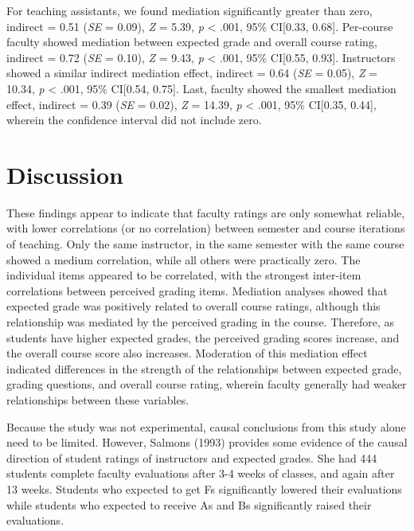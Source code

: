 \documentclass[,man]{apa6}
\theoremstyle{definition}
\theoremstyle{definition}
\theoremstyle{definition}
\theoremstyle{remark}
\begin{document}
For teaching assistants, we found mediation significantly greater than
zero, indirect = 0.51 (\emph{SE} = 0.09), \emph{Z} = 5.39, \emph{p}
\textless{} .001, 95\% CI{[}0.33, 0.68{]}. Per-course faculty showed
mediation between expected grade and overall course rating, indirect =
0.72 (\emph{SE} = 0.10), \emph{Z} = 9.43, \emph{p} \textless{} .001,
95\% CI{[}0.55, 0.93{]}. Instructors showed a similar indirect mediation
effect, indirect = 0.64 (\emph{SE} = 0.05), \emph{Z} = 10.34, \emph{p}
\textless{} .001, 95\% CI{[}0.54, 0.75{]}. Last, faculty showed the
smallest mediation effect, indirect = 0.39 (\emph{SE} = 0.02), \emph{Z}
= 14.39, \emph{p} \textless{} .001, 95\% CI{[}0.35, 0.44{]}, wherein the
confidence interval did not include zero.

\hypertarget{discussion}{%
\section{Discussion}\label{discussion}}

These findings appear to indicate that faculty ratings are only somewhat
reliable, with lower correlations (or no correlation) between semester
and course iterations of teaching. Only the same instructor, in the same
semester with the same course showed a medium correlation, while all
others were practically zero. The individual items appeared to be
correlated, with the strongest inter-item correlations between perceived
grading items. Mediation analyses showed that expected grade was
positively related to overall course ratings, although this relationship
was mediated by the perceived grading in the course. Therefore, as
students have higher expected grades, the perceived grading scores
increase, and the overall course score also increases. Moderation of
this mediation effect indicated differences in the strength of the
relationships between expected grade, grading questions, and overall
course rating, wherein faculty generally had weaker relationships
between these variables.

Because the study was not experimental, causal conclusions from this
study alone need to be limited. However, Salmons (1993) provides some
evidence of the causal direction of student ratings of instructors and
expected grades. She had 444 students complete faculty evaluations after
3-4 weeks of classes, and again after 13 weeks. Students who expected to
get Fs significantly lowered their evaluations while students who
expected to receive As and Bs significantly raised their evaluations.
\end{document}
